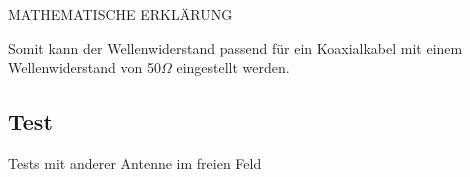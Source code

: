 MATHEMATISCHE ERKLÄRUNG

Somit kann der Wellenwiderstand passend für ein Koaxialkabel mit einem Wellenwiderstand von 50$\Omega$ eingestellt werden.

\subsection{Test}

Tests mit anderer Antenne im freien Feld